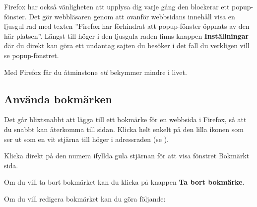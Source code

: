 \documentclass[a4paper,final]{memoir} %
\begin{document}
Firefox har också vänligheten att upplysa dig varje gång den blockerar ett popup-fönster. Det gör webbläsaren genom att ovanför webbsidans innehåll visa en ljusgul rad med texten ''Firefox har förhindrat att popup-fönster öppnats av den här platsen''. Längst till höger i den ljusgula raden finns knappen \textbf{Inställningar} där du direkt kan göra ett undantag sajten du besöker i det fall du verkligen vill se popup-fönstret.

Med Firefox får du åtminstone \textit{ett} bekymmer mindre i livet.


\subsection{Använda bokmärken}


Det går blixtsnabbt att lägga till ett bokmärke för en webbsida i Firefox, så att du snabbt kan återkomma till sidan. Klicka helt enkelt på den lilla ikonen som ser ut som en vit stjärna till höger i adressraden (se ).


Klicka direkt på den numera ifyllda gula stjärnan för att visa fönstret Bokmärkt sida. 

Om du vill ta bort bokmärket kan du klicka på knappen \textbf{Ta bort bokmärke}. 

Om du vill redigera bokmärket kan du göra följande:
\end{document}
